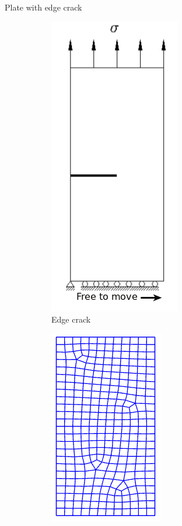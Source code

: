 \documentclass{beamer}
\begin{document}
\begin{frame}[t,fragile]{Plate with edge crack}
    \vspace{-20pt}
\begin{figure}
    \begin{subfigure}{.2\textwidth}
         \includegraphics[scale=.20]{3.png}
         \caption{\scriptsize Edge crack}
    \end{subfigure}
    \hspace{15pt}
    \begin{subfigure}{.2\textwidth}
    \vspace{15pt}
              \includegraphics[scale=.22]{untitled1.png}

\end{subfigure}
\end{figure}
\end{frame}
\end{document}
